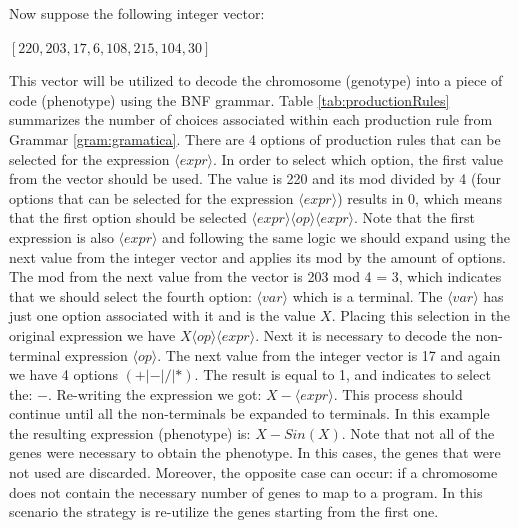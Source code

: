 \documentclass[conference]{IEEEtran}
\begin{document}
\noindent
Now suppose the following integer vector:

\begin{center}
	$ [220, 203, 17, 6, 108, 215, 104, 30] $
\end{center}

This vector will be utilized to decode the chromosome (genotype) into a piece of code (phenotype)  using the BNF grammar.
Table \ref{tab:productionRules} summarizes the number of choices associated within each production rule from Grammar \ref{gram:gramatica}. There are 4 options of production rules that can be selected for the expression $ \langle expr \rangle$. In order to select which option, the first value from the vector should be used. The value is 220 and its mod divided by 4 (four options that can be selected for the expression $ \langle expr \rangle$) results in 0, which means that the first option should be selected $\langle expr \rangle \langle op \rangle \langle expr \rangle$. Note that the first expression is also $ \langle expr \rangle$ and following the same logic we should expand using the next value from the integer vector and applies its mod by the amount of options. The mod from the next value from the vector is 203 mod 4 = 3, which indicates that we should select the fourth option: $ \langle var \rangle$ which is a terminal. The $ \langle var \rangle$ has just one option associated with it and is the value $X$. Placing this selection in the original expression we have $X \langle op \rangle \langle expr \rangle$. Next it is necessary to decode the non-terminal expression $\langle op \rangle$. The next value from the integer vector is 17 and again we have 4 options $(+ | - | / | *)$. The result is equal to 1, and indicates to select the: $-$. Re-writing the expression we got:  $X  -  \langle expr \rangle$. This process should continue until all the non-terminals be expanded to terminals. In this example the resulting expression (phenotype) is: $X - Sin (X)$. Note that not all of the genes were necessary to obtain the phenotype. In this cases, the genes that were not used are discarded. Moreover, the opposite case can occur: if a chromosome does not contain the necessary number of genes to map to a program. In this scenario the strategy is re-utilize the genes starting from the first one.
\end{document}
